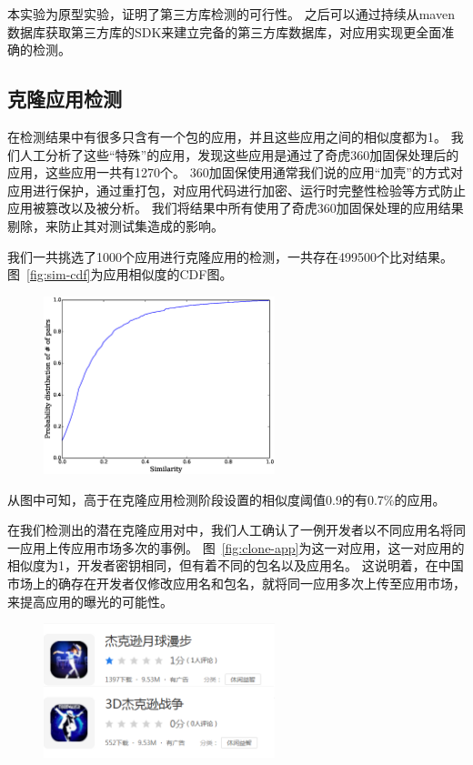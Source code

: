 本实验为原型实验，证明了第三方库检测的可行性。
之后可以通过持续从maven数据库获取第三方库的SDK来建立完备的第三方库数据库，对应用实现更全面准确的检测。

\subsection{克隆应用检测}

在检测结果中有很多只含有一个包的应用，并且这些应用之间的相似度都为1。
我们人工分析了这些“特殊”的应用，发现这些应用是通过了奇虎360加固保处理后的应用，这些应用一共有1270个。
360加固保使用通常我们说的应用“加壳”的方式对应用进行保护，通过重打包，对应用代码进行加密、运行时完整性检验等方式防止应用被篡改以及被分析。
我们将结果中所有使用了奇虎360加固保处理的应用结果剔除，来防止其对测试集造成的影响。

我们一共挑选了1000个应用进行克隆应用的检测，一共存在499500个比对结果。
图~\ref{fig:sim-cdf}为应用相似度的CDF图。

\begin{figure}
	\centering
	\includegraphics[width=0.6\textwidth]{figure/sim-cdf.eps}
\end{figure}

从图中可知，高于在克隆应用检测阶段设置的相似度阈值0.9的有0.7\%的应用。

在我们检测出的潜在克隆应用对中，我们人工确认了一例开发者以不同应用名将同一应用上传应用市场多次的事例。
图~\ref{fig:clone-app}为这一对应用，这一对应用的相似度为1，开发者密钥相同，但有着不同的包名以及应用名。
这说明着，在中国市场上的确存在开发者仅修改应用名和包名，就将同一应用多次上传至应用市场，来提高应用的曝光的可能性。

\begin{figure}
	\centering
	\includegraphics[width=0.6\textwidth]{figure/clone-pair.png}
\end{figure}

